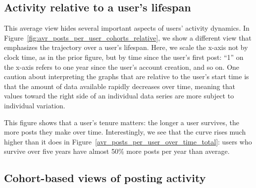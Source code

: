 \subsection{Activity relative to a user's lifespan}


This average view hides several important aspects of users' activity dynamics.  In Figure~\ref{fig:avr_posts_per_user_cohorts_relative}, we show a different view that emphasizes the trajectory over a user's lifespan.  Here, we scale the x-axis not by clock time, as in the prior figure, but by time since the user's first post: ``1'' on the x-axis refers to one year since the user's account creation, and so on.  
One caution about interpreting the graphs that are relative to the user's start time is that the amount of data available rapidly decreases over time, meaning that values toward the right side of an individual data series are more subject to individual variation.  

This figure shows that a user's tenure matters: the longer a user survives, the more posts they make over time.  Interestingly, we see that the curve rises much higher than it does in Figure~\ref{avr_posts_per_user_over_time_total}: users who survive over five years have almost 50\% more posts per year than average. 

\subsection{Cohort-based views of posting activity}


